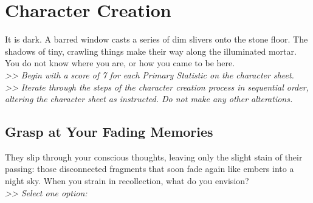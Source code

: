 \section{Character Creation}
\label{chargen}
\hypertarget{chargen}{}
It is dark. A barred window casts a series of dim slivers onto the stone floor. The shadows of tiny, crawling things make their way along the illuminated mortar. You do not know where you are, or how you came to be here.\\
\emph{>> Begin with a score of 7 for each Primary Statistic on the character sheet.\\
>> Iterate through the steps of the character creation process in sequential order, altering the character sheet as instructed. Do not make any other alterations.}

\subsection*{Grasp at Your Fading Memories}
They slip through your conscious thoughts, leaving only the slight stain of their passing: those disconnected fragments that soon fade again like embers into a night sky. When you strain in recollection, what do you envision?\\
\emph{>> Select one option:}

